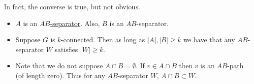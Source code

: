 \documentclass{article}
\begin{document}
In fact, the converse is true, but not obvious.
\begin{remark}\leavevmode
    \begin{itemize}
        \item $A$ is an \hyperlink{def:abpath}{$AB$-separator}. Also, $B$ is an $AB$-separator.
        \item Suppose $G$ is \hyperlink{def:kConn}{$k$-connected}.
            Then as long as $|A|,|B| \geq k$ we have that any $AB$-separator $W$ satisfies $|W| \geq k$.
        \item Note that we do not suppose $A \cap B = \emptyset$.
            If $v \in A \cap B$ then $v$ is an \hyperlink{def:abpath}{$AB$-path} (of length zero).
            Thus for any $AB$-separator $W$, $A \cap B \subset W$.
    \end{itemize}
\end{remark}
\end{document}
